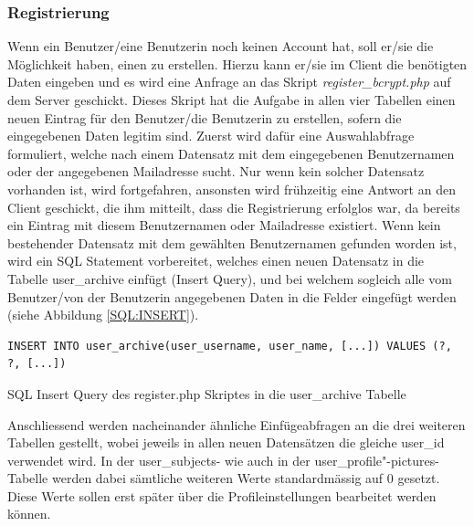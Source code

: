 \documentclass[../main.tex]{subfiles}
\begin{document}
	 
	 \subsubsection{Registrierung}
	 Wenn ein Benutzer/eine Benutzerin noch keinen Account hat, soll er/sie die Möglichkeit haben, einen zu erstellen. Hierzu kann er/sie im Client die benötigten Daten eingeben und es wird eine Anfrage an das Skript \emph{register\_bcrypt.php} auf dem Server geschickt. Dieses Skript hat die Aufgabe in allen vier Tabellen einen neuen Eintrag für den Benutzer/die Benutzerin zu erstellen, sofern die eingegebenen Daten legitim sind. Zuerst wird dafür eine Auswahlabfrage formuliert, welche nach einem Datensatz mit dem eingegebenen Benutzernamen oder der angegebenen Mailadresse sucht. Nur wenn kein solcher Datensatz vorhanden ist, wird fortgefahren, ansonsten wird frühzeitig eine Antwort an den Client geschickt, die ihm mitteilt, dass die Registrierung erfolglos war, da bereits ein Eintrag mit diesem Benutzernamen oder Mailadresse existiert. Wenn kein bestehender Datensatz mit dem gewählten Benutzernamen gefunden worden ist, wird ein SQL Statement vorbereitet, welches einen neuen Datensatz in die Tabelle user\_archive einfügt (Insert Query), und bei welchem sogleich alle vom Benutzer/von der Benutzerin angegebenen Daten in die Felder eingefügt werden (siehe Abbildung \ref{SQL:INSERT}).
	 
	 \begin{code} 
	 	\begin{center}
	 		\begin{verbatim}
INSERT INTO user_archive(user_username, user_name, [...]) VALUES (?, ?, [...])
	 		\end{verbatim}
	 		\caption{SQL Insert Query des register.php Skriptes in die user\_archive Tabelle}\label{SQL:INSERT}
	 	\end{center}
	 \end{code}
	 
	 \sloppy
	 Anschliessend werden nacheinander ähnliche Einfügeabfragen an die drei weiteren Tabellen gestellt, wobei jeweils in allen neuen Datensätzen die gleiche user\_id verwendet wird. In der user\_subjects- wie auch in der user\_profile"-pictures-Tabelle werden dabei sämtliche weiteren Werte standardmässig auf 0 gesetzt. Diese Werte sollen erst später über die Profileinstellungen bearbeitet werden können. 
	 \fussy
	 
\end{document}
